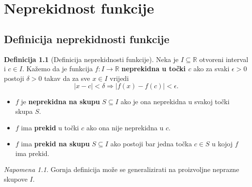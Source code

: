 \documentclass{book}
\theoremstyle{definition}
\theoremstyle{definition}
\newtheorem{definition}{Definicija}
\theoremstyle{remark}
\newtheorem{remark}{Napomena}
\begin{document}
\chapter{Neprekidnost funkcije}
\fancyhead[RO, RE]{}
\section{Definicija neprekidnosti funkcije}
\begin{definition}[Definicija neprekidnosti funkcije]
Neka je $I\subseteq \mathbb{R}$ otvoreni interval i $c\in I$. Kažemo da je funkcija $f : I\to \mathbb{R}$ \textbf{neprekidna u točki $c$} ako za svaki $\epsilon>0$ postoji $\delta>0$ takav da za sve $x\in I$ vrijedi 
$$|x-c|<\delta\Rightarrow |f(x)-f(c)|<\epsilon.$$
\begin{itemize}
\item $f$ je \textbf{neprekidna na skupu} $S\subseteq I$ ako je ona neprekidna u svakoj točki skupa $S$.
\item $f$ ima \textbf{prekid} u točki $c$ ako ona nije neprekidna u $c$.
\item $f$ ima \textbf{prekid na skupu} $S\subseteq I$ ako postoji bar jedna točka $c\in S$ u kojoj $f$ ima prekid.
\end{itemize}
\end{definition}

\begin{remark}
Gornja definicija može se generalizirati na proizvoljne neprazne skupove $I$.
\end{remark}
\end{document}
